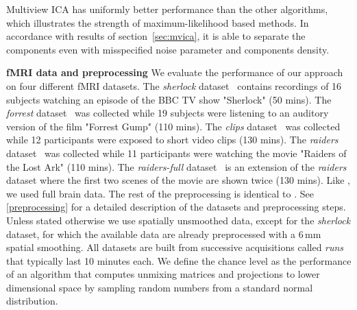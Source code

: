 \documentclass{report}
\begin{document}
Multiview ICA has uniformly better performance than the other algorithms, which illustrates the strength of maximum-likelihood based methods. In accordance with results of section~\ref{sec:mvica}, it is able to separate the components even with misspecified noise parameter and components density.
%

\textbf{fMRI data and preprocessing} 
We evaluate the performance of our approach on four different fMRI datasets.
%
The \emph{sherlock} dataset~\cite{chen2017shared} contains recordings of 16 subjects watching an episode of the BBC TV show "Sherlock" (50 mins).
%
The \emph{forrest} dataset~\cite{hanke2014high} was collected while 19 subjects were listening to an auditory version of the film "Forrest Gump" (110 mins).
%
The \emph{clips} dataset~\cite{ibc} was collected while 12 participants were exposed to short video clips (130 mins).
%
The \emph{raiders} dataset~\cite{ibc} was collected while 11 participants were watching the movie "Raiders of the Lost Ark" (110 mins).
%
The \emph{raiders-full} dataset~\cite{ibc} is an extension of the \emph{raiders} dataset where the first two scenes of the movie are shown twice (130 mins).
%
Like \cite{zhang2016searchlight}, we used full brain data. The rest of the preprocessing is identical to \cite{chen2017shared}. See \ref{preprocessing} for a detailed description of the datasets and preprocessing steps. Unless stated otherwise we use spatially unsmoothed data, except for the \emph{sherlock} dataset, for which the available data are already preprocessed with a 6\,mm spatial smoothing. All datasets are built from successive acquisitions called \emph{runs} that typically last 10 minutes each.
%
We define the chance level as the performance of an algorithm that computes unmixing matrices and projections to lower dimensional space by sampling random numbers from a standard normal distribution. 
%
\end{document}
